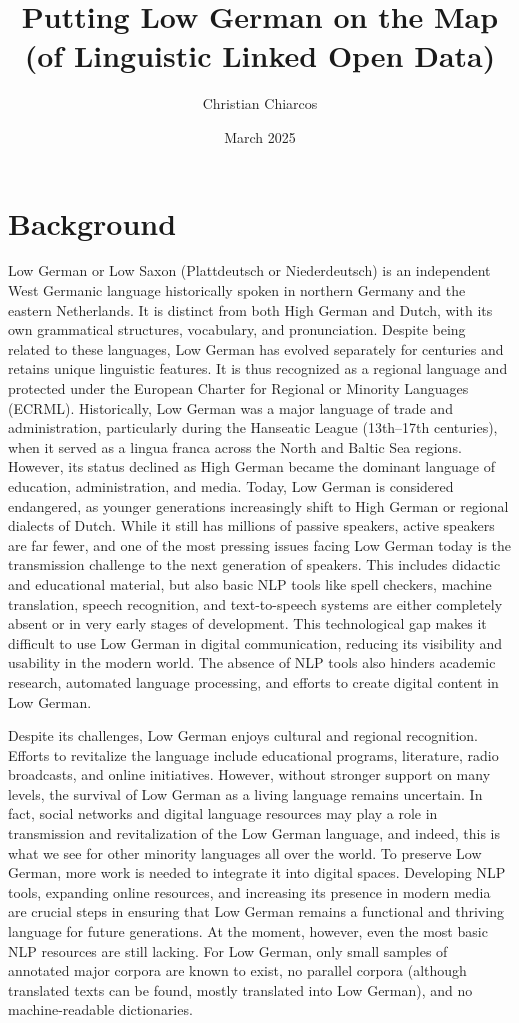\documentclass{article}
\title{Putting Low German on the Map (of Linguistic Linked Open Data)}
\author{Christian Chiarcos}
\date{March 2025}
\begin{document}
\maketitle

\section{Background}

Low German or Low Saxon (Plattdeutsch or Niederdeutsch) is an independent West Germanic language historically spoken in northern Germany and the eastern Netherlands. It is distinct from both High German and Dutch, with its own grammatical structures, vocabulary, and pronunciation. Despite being related to these languages, Low German has evolved separately for centuries and retains unique linguistic features. It is thus recognized as a regional language and protected under the European Charter for Regional or Minority Languages (ECRML). 
Historically, Low German was a major language of trade and administration, particularly during the Hanseatic League (13th–17th centuries), when it served as a lingua franca across the North and Baltic Sea regions. However, its status declined as High German became the dominant language of education, administration, and media. Today, Low German is considered endangered, as younger generations increasingly shift to High German or regional dialects of Dutch. While it still has millions of passive speakers, active speakers are far fewer, and one of the most pressing issues facing Low German today is the transmission challenge to the next generation of speakers. This includes didactic and educational material, but also basic NLP tools like spell checkers, machine translation, speech recognition, and text-to-speech systems are either completely absent or in very early stages of development. This technological gap makes it difficult to use Low German in digital communication, reducing its visibility and usability in the modern world. The absence of NLP tools also hinders academic research, automated language processing, and efforts to create digital content in Low German. 

Despite its challenges, Low German enjoys cultural and regional recognition. Efforts to revitalize the language include educational programs, literature, radio broadcasts, and online initiatives. However, without stronger support on many levels, the survival of Low German as a living language remains uncertain. In fact, social networks and digital language resources may play a role in transmission and revitalization of the Low German language, and indeed, this is what we see for other minority languages all over the world. 
To preserve Low German, more work is needed to integrate it into digital spaces. Developing NLP tools, expanding online resources, and increasing its presence in modern media are crucial steps in ensuring that Low German remains a functional and thriving language for future generations. At the moment, however, even the most basic NLP resources are still lacking. For Low German, only small samples of annotated major corpora are known to exist, no parallel corpora (although translated texts can be found, mostly translated into Low German), and no machine-readable dictionaries. 
\end{document}
